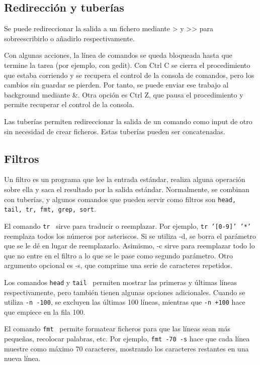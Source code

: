\subsection{Redirección y tuberías}
Se puede redireccionar la salida a un fichero mediante > y >> para sobreescribirlo o añadirlo respectivamente. 

Con algunas acciones, la línea de comandos se queda bloqueada hasta que termine la tarea (por ejemplo, con gedit). Con Ctrl C se cierra el procedimiento que estaba corriendo y se recupera el control de la consola de comandos, pero los cambios sin guardar se pierden. Por tanto, se puede enviar ese trabajo al background mediante \&. Otra opción es Ctrl Z, que pausa el procedimiento y permite recuperar el control de la consola.

Las tuberías permiten redireccionar la salida de un comando como input de otro sin necesidad de crear ficheros. Estas tuberías pueden ser concatenadas.

\subsection{Filtros}
Un filtro es un programa que lee la entrada estándar, realiza alguna operación sobre ella y saca el resultado por la salida estándar. Normalmente, se combinan con tuberías, y algunos comandos que pueden servir como filtros son \texttt{head, tail, tr, fmt, grep, sort}.

El comando \texttt{tr} \marginpar[\footnotesize tr] \ sirve para traducir o reemplazar. Por ejemplo, \texttt{tr '[0-9]' '*'} reemplaza todos los números por asteriscos. Si se utiliza -d, se borra el parámetro que se le dé en lugar de reemplazarlo. Asimismo, -c sirve para reemplazar todo lo que no entre en el filtro a lo que se le pase como segundo parámetro. Otro argumento opcional es -s, que comprime  una serie de caracteres repetidos.

Los comandos \texttt{head} y \texttt{tail}  \ permiten mostrar las primeras y últimas líneas respectivamente, pero también tienen algunas opciones adicionales. Cuando se utiliza \texttt{-n -100}, se excluyen las últimas 100 líneas, mientras que \texttt{-n +100} hace que empiece en la fila 100. 

El comando \texttt{fmt}  \ permite formatear ficheros para que las líneas sean más pequeñas, recolocar palabras, etc. Por ejemplo, \texttt{fmt -70 -s} hace que cada línea muestre como máximo 70 caracteres, mostrando los caracteres restantes en una nueva línea.

